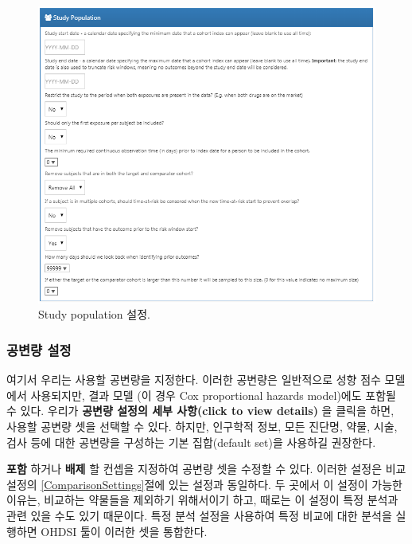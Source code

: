 \documentclass[11pt]{book}
\theoremstyle{definition}
\theoremstyle{definition}
\theoremstyle{definition}
\theoremstyle{remark}
\begin{document}
\begin{figure}

{\centering \includegraphics[width=1\linewidth]{images/PopulationLevelEstimation/studyPopulation} 

}

\caption{Study population 설정.}\label{fig:studyPopulation}
\end{figure}

\subsubsection*{공변량 설정}\label{-}

여기서 우리는 사용할 공변량을 지정한다. 이러한 공변량은 일반적으로 성향
점수 모델에서 사용되지만, 결과 모델 (이 경우 Cox proportional hazards
model)에도 포함될 수 있다. 우리가 \textbf{공변량 설정의 세부 사항(click
to view details)} 을 클릭을 하면, 사용할 공변량 셋을 선택할 수 있다.
하지만, 인구학적 정보, 모든 진단명, 약물, 시술, 검사 등에 대한 공변량을
구성하는 기본 집합(default set)을 사용하길 권장한다.

\textbf{포함} 하거나 \textbf{배제} 할 컨셉을 지정하여 공변량 셋을 수정할
수 있다. 이러한 설정은 비교 설정의 \ref{ComparisonSettings}절에 있는
설정과 동일하다. 두 곳에서 이 설정이 가능한 이유는, 비교하는 약물들을
제외하기 위해서이기 하고, 때로는 이 설정이 특정 분석과 관련 있을 수도
있기 때문이다. 특정 분석 설정을 사용하여 특정 비교에 대한 분석을
실행하면 OHDSI 툴이 이러한 셋을 통합한다.
\end{document}
